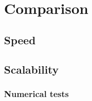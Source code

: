 
\section{Comparison}\label{sec:numer}

\subsection{Speed}

\subsection{Scalability}

\begin{frame}
  \MyLogo
  \frametitle{Numerical tests}  

\end{frame}